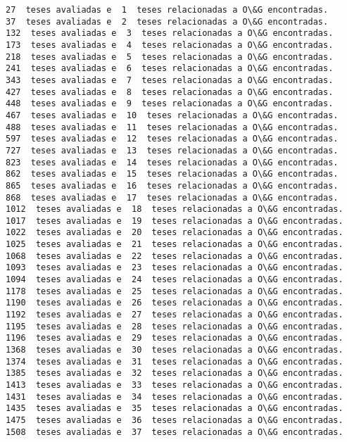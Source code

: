\documentclass[11pt]{article}
\begin{document}
    \begin{Verbatim}[commandchars=\\\{\}]
27  teses avaliadas e  1  teses relacionadas a O\&G encontradas.
37  teses avaliadas e  2  teses relacionadas a O\&G encontradas.
132  teses avaliadas e  3  teses relacionadas a O\&G encontradas.
173  teses avaliadas e  4  teses relacionadas a O\&G encontradas.
218  teses avaliadas e  5  teses relacionadas a O\&G encontradas.
241  teses avaliadas e  6  teses relacionadas a O\&G encontradas.
343  teses avaliadas e  7  teses relacionadas a O\&G encontradas.
427  teses avaliadas e  8  teses relacionadas a O\&G encontradas.
448  teses avaliadas e  9  teses relacionadas a O\&G encontradas.
467  teses avaliadas e  10  teses relacionadas a O\&G encontradas.
488  teses avaliadas e  11  teses relacionadas a O\&G encontradas.
597  teses avaliadas e  12  teses relacionadas a O\&G encontradas.
727  teses avaliadas e  13  teses relacionadas a O\&G encontradas.
823  teses avaliadas e  14  teses relacionadas a O\&G encontradas.
862  teses avaliadas e  15  teses relacionadas a O\&G encontradas.
865  teses avaliadas e  16  teses relacionadas a O\&G encontradas.
868  teses avaliadas e  17  teses relacionadas a O\&G encontradas.
1012  teses avaliadas e  18  teses relacionadas a O\&G encontradas.
1017  teses avaliadas e  19  teses relacionadas a O\&G encontradas.
1022  teses avaliadas e  20  teses relacionadas a O\&G encontradas.
1025  teses avaliadas e  21  teses relacionadas a O\&G encontradas.
1068  teses avaliadas e  22  teses relacionadas a O\&G encontradas.
1093  teses avaliadas e  23  teses relacionadas a O\&G encontradas.
1094  teses avaliadas e  24  teses relacionadas a O\&G encontradas.
1178  teses avaliadas e  25  teses relacionadas a O\&G encontradas.
1190  teses avaliadas e  26  teses relacionadas a O\&G encontradas.
1192  teses avaliadas e  27  teses relacionadas a O\&G encontradas.
1195  teses avaliadas e  28  teses relacionadas a O\&G encontradas.
1196  teses avaliadas e  29  teses relacionadas a O\&G encontradas.
1368  teses avaliadas e  30  teses relacionadas a O\&G encontradas.
1374  teses avaliadas e  31  teses relacionadas a O\&G encontradas.
1385  teses avaliadas e  32  teses relacionadas a O\&G encontradas.
1413  teses avaliadas e  33  teses relacionadas a O\&G encontradas.
1431  teses avaliadas e  34  teses relacionadas a O\&G encontradas.
1435  teses avaliadas e  35  teses relacionadas a O\&G encontradas.
1475  teses avaliadas e  36  teses relacionadas a O\&G encontradas.
1508  teses avaliadas e  37  teses relacionadas a O\&G encontradas.

\end{Verbatim}
\end{document}
